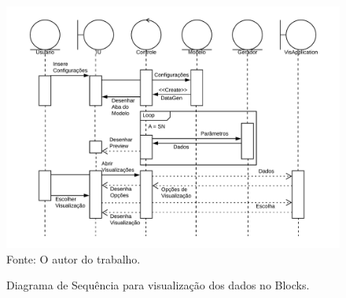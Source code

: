\documentclass[
	12pt,				%
	openright,			%
	oneside,			%
	a4paper,			%
	english,			%
	brazil				%
	]{abntex2}
\begin{document}
	\begin{figure}[h!]
		\centering
		\caption{Diagrama de Sequência para visualização dos dados no Blocks.}
		\includegraphics[width=\linewidth]{./figures/prototipo/DiagramadeSequenciaVisApplication.png}
		\label{fig:DiagramadeSequenciaVisApplication}
		\footnotesize Fonte: O autor do trabalho.
	\end{figure}
\end{document}
